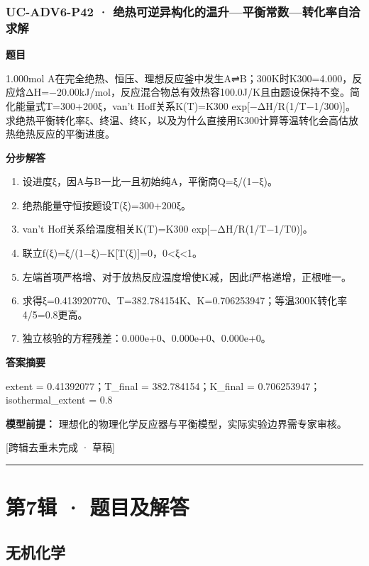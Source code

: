 \documentclass[UTF8,11pt,a4paper]{ctexart}
\begin{document}
\subsubsection*{UC-ADV6-P42 · 绝热可逆异构化的温升—平衡常数—转化率自洽求解}
\noindent\textbf{题目}\par
1.000mol A在完全绝热、恒压、理想反应釜中发生A⇌B；300K时K300=4.000，反应焓ΔH=−20.00kJ/mol，反应混合物总有效热容100.0J/K且由题设保持不变。简化能量式T=300+200ξ，van't Hoff关系K(T)=K300 exp[−ΔH/R(1/T−1/300)]。求绝热平衡转化率ξ、终温、终K，以及为什么直接用K300计算等温转化会高估放热绝热反应的平衡进度。\par
\medskip\noindent\textbf{分步解答}
\begin{enumerate}
\item 设进度ξ，因A与B一比一且初始纯A，平衡商Q=ξ/(1−ξ)。
\item 绝热能量守恒按题设T(ξ)=300+200ξ。
\item van't Hoff关系给温度相关K(T)=K300 exp[−ΔH/R(1/T−1/T0)]。
\item 联立f(ξ)=ξ/(1−ξ)−K[T(ξ)]=0，0<ξ<1。
\item 左端首项严格增、对于放热反应温度增使K减，因此f严格递增，正根唯一。
\item 求得ξ=0.413920770、T=382.784154K、K=0.706253947；等温300K转化率4/5=0.8更高。
\item 独立核验的方程残差：0.000e+0、0.000e+0、0.000e+0。
\end{enumerate}
\noindent\textbf{答案摘要}\par
extent = 0.41392077；T\_final = 382.784154；K\_final = 0.706253947；isothermal\_extent = 0.8\par
\noindent\textbf{模型前提：}
理想化的物理化学反应器与平衡模型，实际实验边界需专家审核。\par
\noindent\textcolor{red!65!black}{[跨辑去重未完成 · 草稿]} \par
\medskip\hrule\medskip
\clearpage
\section*{第7辑 · 题目及解答}
\subsection*{无机化学}
\end{document}
